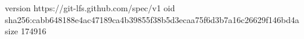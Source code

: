 version https://git-lfs.github.com/spec/v1
oid sha256:cabb648188e4ac47189ca4b39855f38b5d3ecaa75f6d3b7a16c26629f146bd4a
size 174916

